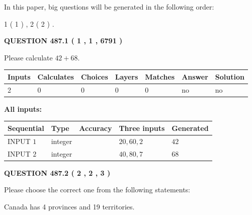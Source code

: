 \documentclass[12pt]{article}
\begin{document}
In this paper, big questions will be generated in the following order: 
   
   
   1 ( 1 )
 ,
   2 ( 2 )
 .
  
\vspace{0.2in}
  
{\textbf{\Large{QUESTION
487.1 
 ( 1 , 1 , 6791 )
}}}
  
  
 
Please calculate $ %
42 +  %
68 $.
 
 
   
   
   
   
\noindent\begin{tabular}{|l|l|l|l|l|l|l|}
 \hline
Inputs & Calculates & Choices & Layers & Matches & Answer & Solution \\ \hline
 2  & 
 0  & 
 0
  & 
 0  & 
 0  & 
  no & 
  no 
  \\ \hline
 \end{tabular}
   
   
   
   
\noindent{}
   
   
   
   
\noindent\vspace{0.1in}\hspace{-0.08in} {\textbf{\Large{All inputs: }}}
   
   
  
  
\noindent\begin{tabular}{|l|l|l|l|l|}
\hline
 Sequential & Type & Accuracy & Three inputs & Generated \\ 
\hline
 
 
  INPUT $  1 $ & integer &  & $
 20
 , 
 60
 , 
 2
 $ & $ 42 $ 
 \\  \hline  
 
 
  INPUT $  2 $ & integer &  & $
 40
 , 
 80
 , 
 7
 $ & $ 68 $ 
 \\  \hline  
 \end{tabular}
   
   
  
\vspace{0.2in}
  
{\textbf{\Large{QUESTION
487.2 
 ( 2 , 2 , 3 )
}}}
  
  
Please choose the correct one from the following statements:
 
 
Canada has   4 provinces and  19 territories.
 
\end{document}
